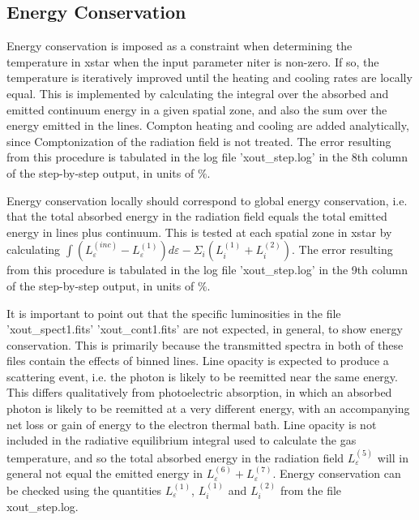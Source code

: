 \subsection{Energy Conservation}

Energy conservation is imposed as a constraint when determining the temperature in xstar when the 
input parameter niter is non-zero.  If so, the temperature is iteratively improved until 
the heating and cooling rates are locally equal.  This is implemented by calculating the 
integral over the absorbed and emitted continuum energy in a given spatial zone, and also 
the sum over the energy emitted in the lines.  Compton heating and cooling are added 
analytically, since Comptonization of the radiation field is not treated. 
The error resulting from this procedure is tabulated in the log file 'xout\_step.log' in the 8th column
of the step-by-step output, in units of $\%$.  

Energy conservation locally should correspond to global energy 
conservation, i.e. that the total absorbed energy in the radiation field 
equals the total emitted energy in lines plus continuum.  This is 
tested at each spatial zone in xstar by calculating 
$\int{(L_{\varepsilon}^{(inc)} - L_{\varepsilon}^{(1)})}d\varepsilon - \Sigma_i(L_i^{(1)}+L_i^{(2)})$.
The error resulting from this procedure is tabulated in the log file 'xout\_step.log' in the 9th column
of the step-by-step output, in units of $\%$.  

It is important to point out that the specific luminosities in 
the file 'xout\_spect1.fits' 'xout\_cont1.fits' are not expected, in general, 
to show energy conservation.  This is primarily because the transmitted 
spectra in both of these files contain the effects of binned lines.
Line opacity is expected to produce a scattering event, i.e. the photon is 
likely to be reemitted near the same energy.  This  differs qualitatively from
photoelectric absorption, in which an absorbed photon is likely to be reemitted 
at a very different energy, with an accompanying net loss or gain of energy 
to the electron thermal bath.  Line opacity is not included in the radiative 
equilibrium integral used to calculate the gas temperature, and so 
the total absorbed energy in the radiation field  $L_{\varepsilon}^{(5)}$ will in 
general not equal the emitted energy in $L_{\varepsilon}^{(6)}+L_{\varepsilon}^{(7)}$.
Energy conservation can be checked using the quantities 
$L_{\varepsilon}^{(1)}$, $L_i^{(1)}$ and $L_i^{(2)}$ 
from the file xout\_step.log. 

